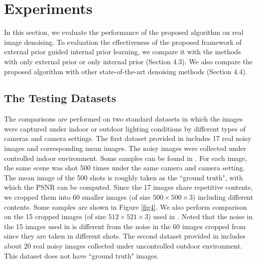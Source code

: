\documentclass[10pt,twocolumn,letterpaper]{article}
\begin{document}
\section{Experiments}

In this section, we evaluate the performance of the proposed algorithm on real image denoising. To evaluation the effectiveness of the proposed framework of external prior guided internal prior learning, we compare it with the methods with only external prior or only internal prior (Section 4.3). We also compare the proposed algorithm with other state-of-the-art denoising methods \cite{bm3d,cbm3d,mlp,wnnm,csf,chen2015learning,crosschannel2016,noiseclinic,ncwebsite,neatimage} (Section 4.4).

\subsection{The Testing Datasets}

The comparisons are performed on two standard datasets in which the images were captured under indoor or outdoor lighting conditions by different types of cameras and camera settings. The first dataset provided in \cite{crosschannel2016} includes 17 real noisy images and corresponding mean images. The noisy images were collected under controlled indoor environment. Some samples can be found in \cite{crosschannel2016}. For each image, the same scene was shot 500 times under the same camera and camera setting. The mean image of the 500 shots is roughly taken as the ``ground truth", with which the PSNR can be computed. Since the 17 images share repetitive contents, we cropped them into 60 smaller images (of size $500\times 500\times3$) including different contents. Some samples are shown in Figure \ref{fig4}. We also perform comparison on the 15 cropped images (of size $512\times 521\times3$) used in \cite{crosschannel2016}. Noted that the noise in the 15 images used in \cite{crosschannel2016} is different from the noise in the 60 images cropped from \cite{crosschannel2016} since they are taken in different shots. The second dataset provided in \cite{ncwebsite} includes about 20 real noisy images collected under uncontrolled outdoor environment. This dataset does not have ``ground truth" images. 
\end{document}
